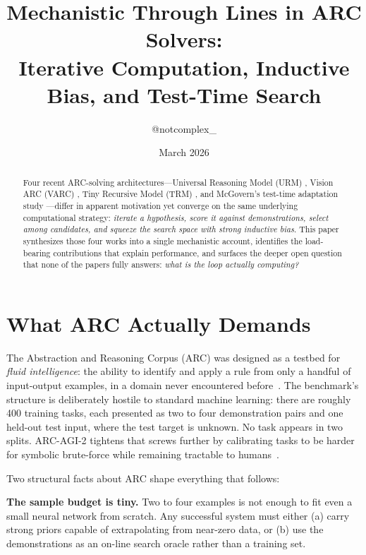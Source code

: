 \documentclass[11pt, letterpaper]{article}
\title{\textbf{Mechanistic Through Lines in ARC Solvers:\\
Iterative Computation, Inductive Bias, and Test-Time Search}}
\author{@notcomplex\_}
\date{March 2026}
\begin{document}
\maketitle

\begin{abstract}
Four recent ARC-solving architectures---Universal Reasoning Model (URM)
\cite{gao2025urm}, Vision ARC (VARC) \cite{hu2025varc}, Tiny Recursive Model
(TRM) \cite{jolicoeur2025trm}, and McGovern's test-time adaptation study
\cite{mcgovern2025ttatrm}---differ in apparent motivation yet converge on the
same underlying computational strategy: \emph{iterate a hypothesis, score it
against demonstrations, select among candidates, and squeeze the search space
with strong inductive bias}. This paper synthesizes those four works into a
single mechanistic account, identifies the load-bearing contributions that
explain performance, and surfaces the deeper open question that none of the
papers fully answers: \emph{what is the loop actually computing?}
\end{abstract}

\section{What ARC Actually Demands}
\label{sec:what_arc_demands}

The Abstraction and Reasoning Corpus (ARC) was designed as a testbed for
\emph{fluid intelligence}: the ability to identify and apply a rule from only
a handful of input-output examples, in a domain never encountered
before~\cite{chollet2019arc}. The benchmark's structure is deliberately
hostile to standard machine learning: there are roughly 400 training tasks,
each presented as two to four demonstration pairs and one held-out test
input, where the test target is unknown. No task appears in two splits.
ARC-AGI-2 tightens that screws further by calibrating tasks to be harder
for symbolic brute-force while remaining tractable to humans~\cite{arcprizefoundation2025}.

Two structural facts about ARC shape everything that follows:

\textbf{The sample budget is tiny.} Two to four examples is not enough to fit
even a small neural network from scratch. Any successful system must either
(a) carry strong priors capable of extrapolating from near-zero data, or (b)
use the demonstrations as an on-line search oracle rather than a training set.
\end{document}
